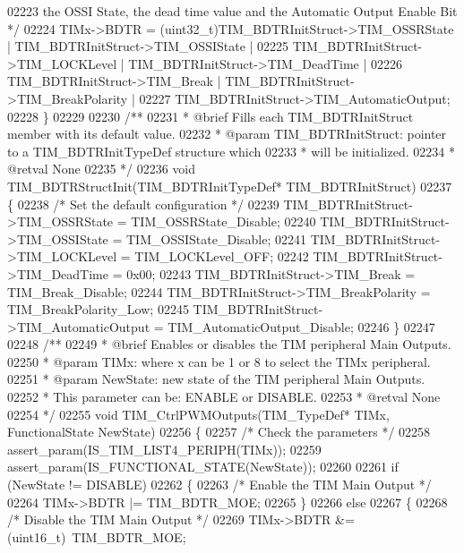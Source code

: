 \begin{DoxyCode}
02223 \textcolor{comment}{     the OSSI State, the dead time value and the Automatic Output Enable Bit */}
02224   TIMx->BDTR = (uint32\_t)TIM\_BDTRInitStruct->TIM\_OSSRState | TIM\_BDTRInitStruct->TIM\_OSSIState |
02225              TIM\_BDTRInitStruct->TIM\_LOCKLevel | TIM\_BDTRInitStruct->TIM\_DeadTime |
02226              TIM\_BDTRInitStruct->TIM\_Break | TIM\_BDTRInitStruct->TIM\_BreakPolarity |
02227              TIM\_BDTRInitStruct->TIM\_AutomaticOutput;
02228 \}
02229 
02230 \textcolor{comment}{/**}
02231 \textcolor{comment}{  * @brief  Fills each TIM\_BDTRInitStruct member with its default value.}
02232 \textcolor{comment}{  * @param  TIM\_BDTRInitStruct: pointer to a TIM\_BDTRInitTypeDef structure which}
02233 \textcolor{comment}{  *         will be initialized.}
02234 \textcolor{comment}{  * @retval None}
02235 \textcolor{comment}{  */}
02236 \textcolor{keywordtype}{void} TIM_BDTRStructInit(TIM\_BDTRInitTypeDef* TIM\_BDTRInitStruct)
02237 \{
02238   \textcolor{comment}{/* Set the default configuration */}
02239   TIM\_BDTRInitStruct->TIM_OSSRState = TIM_OSSRState_Disable;
02240   TIM\_BDTRInitStruct->TIM_OSSIState = TIM_OSSIState_Disable;
02241   TIM\_BDTRInitStruct->TIM_LOCKLevel = TIM_LOCKLevel_OFF;
02242   TIM\_BDTRInitStruct->TIM_DeadTime = 0x00;
02243   TIM\_BDTRInitStruct->TIM_Break = TIM_Break_Disable;
02244   TIM\_BDTRInitStruct->TIM_BreakPolarity = TIM_BreakPolarity_Low;
02245   TIM\_BDTRInitStruct->TIM_AutomaticOutput = TIM_AutomaticOutput_Disable;
02246 \}
02247 
02248 \textcolor{comment}{/**}
02249 \textcolor{comment}{  * @brief  Enables or disables the TIM peripheral Main Outputs.}
02250 \textcolor{comment}{  * @param  TIMx: where x can be 1 or 8 to select the TIMx peripheral.}
02251 \textcolor{comment}{  * @param  NewState: new state of the TIM peripheral Main Outputs.}
02252 \textcolor{comment}{  *          This parameter can be: ENABLE or DISABLE.}
02253 \textcolor{comment}{  * @retval None}
02254 \textcolor{comment}{  */}
02255 \textcolor{keywordtype}{void} TIM_CtrlPWMOutputs(TIM\_TypeDef* TIMx, FunctionalState NewState)
02256 \{
02257   \textcolor{comment}{/* Check the parameters */}
02258   assert_param(IS\_TIM\_LIST4\_PERIPH(TIMx));
02259   assert_param(IS\_FUNCTIONAL\_STATE(NewState));
02260 
02261   \textcolor{keywordflow}{if} (NewState != DISABLE)
02262   \{
02263     \textcolor{comment}{/* Enable the TIM Main Output */}
02264     TIMx->BDTR |= TIM_BDTR_MOE;
02265   \}
02266   \textcolor{keywordflow}{else}
02267   \{
02268     \textcolor{comment}{/* Disable the TIM Main Output */}
02269     TIMx->BDTR &= (uint16\_t)~TIM_BDTR_MOE;

\end{DoxyCode}
